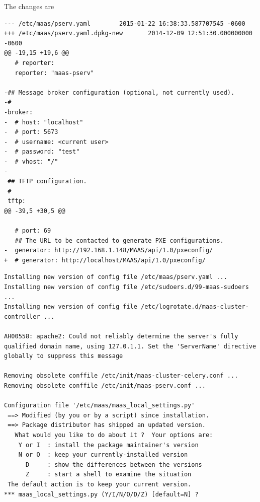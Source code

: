 The changes are
\begin{verbatim}
--- /etc/maas/pserv.yaml        2015-01-22 16:38:33.587707545 -0600
+++ /etc/maas/pserv.yaml.dpkg-new       2014-12-09 12:51:30.000000000 -0600
@@ -19,15 +19,6 @@
   # reporter:
   reporter: "maas-pserv"

-## Message broker configuration (optional, not currently used).
-#
-broker:
-  # host: "localhost"
-  # port: 5673
-  # username: <current user>
-  # password: "test"
-  # vhost: "/"
-
 ## TFTP configuration.
 #
 tftp:
@@ -39,5 +30,5 @@

   # port: 69
   ## The URL to be contacted to generate PXE configurations.
-  generator: http://192.168.1.148/MAAS/api/1.0/pxeconfig/
+  # generator: http://localhost/MAAS/api/1.0/pxeconfig/
\end{verbatim}

\begin{verbatim}
Installing new version of config file /etc/maas/pserv.yaml ...
Installing new version of config file /etc/sudoers.d/99-maas-sudoers ...
Installing new version of config file /etc/logrotate.d/maas-cluster-controller ...

AH00558: apache2: Could not reliably determine the server's fully qualified domain name, using 127.0.1.1. Set the 'ServerName' directive globally to suppress this message

Removing obsolete conffile /etc/init/maas-cluster-celery.conf ...
Removing obsolete conffile /etc/init/maas-pserv.conf ...

Configuration file '/etc/maas/maas_local_settings.py'
 ==> Modified (by you or by a script) since installation.
 ==> Package distributor has shipped an updated version.
   What would you like to do about it ?  Your options are:
    Y or I  : install the package maintainer's version
    N or O  : keep your currently-installed version
      D     : show the differences between the versions
      Z     : start a shell to examine the situation
 The default action is to keep your current version.
*** maas_local_settings.py (Y/I/N/O/D/Z) [default=N] ?

\end{verbatim}


